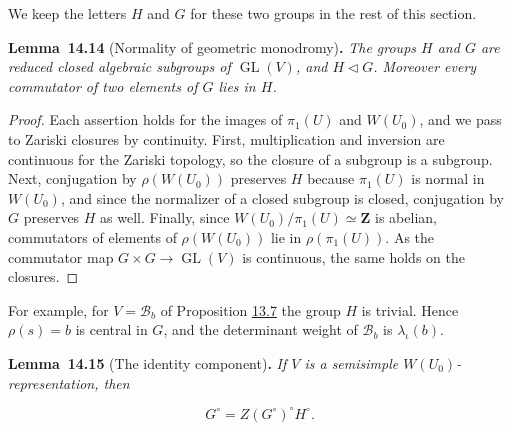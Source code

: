 \documentclass[11pt]{article}
\newenvironment{bpstatement}[2]{\par\addvspace{0.6\baselineskip}\noindent\textbf{#1}#2\textbf{.}\enspace\ignorespaces}
  {\par\addvspace{0.4\baselineskip}}
\newenvironment{bpstatementit}[2]{\begin{bpstatement}{#1}{#2}\itshape\ignorespaces}{\end{bpstatement}}
\providecommand{\GL}{}\renewcommand{\GL}{\operatorname{GL}}
\begin{document}
\label{bp83}%
We keep the letters \(H\) and \(G\) for these two groups in the rest of this section.

\label{bp84}%
\begin{bpstatementit}{Lemma~14.14}{ (Normality of geometric monodromy)}
The groups \(H\) and \(G\) are reduced closed algebraic subgroups of \(\GL(V)\), and \(H\triangleleft G\). Moreover every commutator of two elements of \(G\) lies in \(H\).
\end{bpstatementit}

\begin{proof}[{Proof}]\label{bp85}%
Each assertion holds for the images of \(\pi_1(U)\) and \(W(U_0)\), and we pass to Zariski closures by continuity. First, multiplication and inversion are continuous for the Zariski topology, so the closure of a subgroup is a subgroup. Next, conjugation by \(\rho(W(U_0))\) preserves \(H\) because \(\pi_1(U)\) is normal in \(W(U_0)\), and since the normalizer of a closed subgroup is closed, conjugation by \(G\) preserves \(H\) as well. Finally, since \(W(U_0)/\pi_1(U)\simeq\mathbf Z\) is abelian, commutators of elements of \(\rho(W(U_0))\) lie in \(\rho(\pi_1(U))\). As the commutator map \(G\times G\to\GL(V)\) is continuous, the same holds on the closures.
\end{proof}

\label{bp86}%
For example, for \(V=\mathcal B_b\) of Proposition \hyperref[bp24]{13.7} the group \(H\) is trivial. Hence \(\rho(s)=b\) is central in \(G\), and the determinant weight of \(\mathcal B_b\) is \(\lambda_\iota(b)\).

\label{bp87}%
\begin{bpstatementit}{Lemma~14.15}{ (The identity component)}
If \(V\) is a semisimple \(W(U_0)\)-representation, then

\[
G^\circ=Z(G^\circ)^\circ H^\circ.
\]
\end{bpstatementit}
\end{document}
